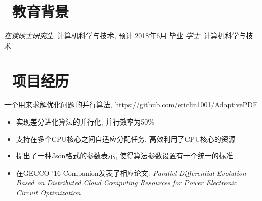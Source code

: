 \documentclass{resume}
\newcommand\quelle[1]{{%
		\unskip\nobreak\hfil\penalty50
		\hskip2em\hbox{}\nobreak\hfil #1%
\parfillskip=0pt \finalhyphendemerits=0 \par}}
\begin{document}


\basicInfo{
	\email{ericlin1001@qq.com} \textperiodcentered\ 
	\phone{(+86) 135-8053-2764} 
}

\section{\faGraduationCap\ 教育背景}
\textit{在读硕士研究生}\  计算机科学与技术, 预计 2018年6月 毕业
\textit{学士}\ 计算机科学与技术 


\section{\faUsers\ 项目经历}

一个用来求解优化问题的并行算法, \url{https://github.com/ericlin1001/AdaptivePDE}

\begin{itemize}
	\item 实现差分进化算法的并行化, 并行效率为50\%
	\item 支持在多个CPU核心之间自适应分配任务, 高效利用了CPU核心的资源
	\item 提出了一种Json格式的参数表示, 使得算法参数设置有一个统一的标准
	\item 在GECCO '16 Companion发表了相应论文: \textit{Parallel Differential Evolution Based on Distributed Cloud Computing Resources for Power Electronic Circuit Optimization} %
\end{itemize}
\end{document}
